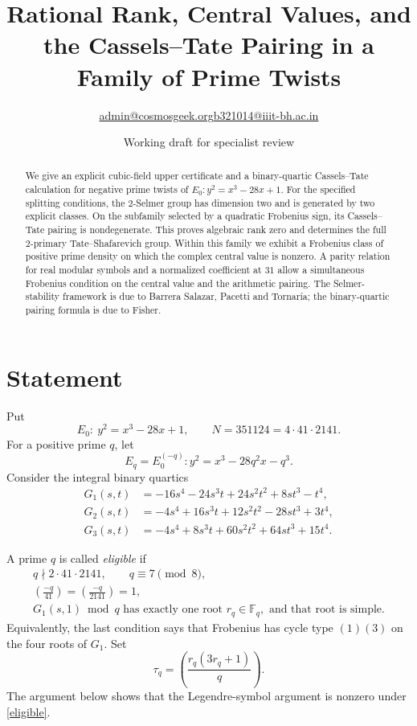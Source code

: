 \documentclass[11pt]{article}
\title{Rational Rank, Central Values, and the Cassels--Tate Pairing
in a Family of Prime Twists}
\author{\small \href{mailto:admin@cosmosgeek.org}{admin@cosmosgeek.org}\qquad \href{mailto:b321014@iiit-bh.ac.in}{b321014@iiit-bh.ac.in}}
\date{Working draft for specialist review}
\newcommand{\F}{\mathbb F}
\begin{document}
\maketitle

\begin{abstract}
We give an explicit cubic-field upper certificate and a
binary-quartic Cassels--Tate calculation for negative prime
twists of $E_0:y^2=x^3-28x+1$.
For the specified splitting conditions, the $2$-Selmer group
has dimension two and is generated by two explicit classes.
On the subfamily selected by a quadratic Frobenius sign, its
Cassels--Tate pairing is nondegenerate. This proves algebraic
rank zero and determines the full $2$-primary Tate--Shafarevich
group. Within this family we exhibit a Frobenius class of positive
prime density on which the complex central value is nonzero. A parity
relation for real modular symbols and a normalized coefficient at $31$
allow a simultaneous Frobenius condition on the central value and
the arithmetic pairing.
The Selmer-stability framework is due to Barrera Salazar,
Pacetti and Tornar\'ia; the binary-quartic pairing formula
is due to Fisher.
\end{abstract}

\section{Statement}

Put
\[
E_0:\ y^2=x^3-28x+1,\qquad
N=351124=4\cdot41\cdot2141.
\]
For a positive prime $q$, let
\[
E_q=E_0^{(-q)}:
y^2=x^3-28q^2x-q^3.
\]
Consider the integral binary quartics
\begin{align*}
G_1(s,t)&=-16s^4-24s^3t+24s^2t^2+8st^3-t^4,\\
G_2(s,t)&=-4s^4+16s^3t+12s^2t^2-28st^3+3t^4,\\
G_3(s,t)&=-4s^4+8s^3t+60s^2t^2+64st^3+15t^4.
\end{align*}

A prime $q$ is called \emph{eligible} if
\begin{equation}\label{eligible}
\begin{gathered}
q\nmid 2\cdot41\cdot2141,\qquad q\equiv7\pmod8,\\
\left(\frac{-q}{41}\right)
=\left(\frac{-q}{2141}\right)=1,\\
G_1(s,1)\bmod q
\text{ has exactly one root }r_q\in\F_q,
\text{ and that root is simple}.
\end{gathered}
\end{equation}
Equivalently, the last condition says that Frobenius has
cycle type $(1)(3)$ on the four roots of $G_1$.
Set
\[
\tau_q=\left(\frac{r_q(3r_q+1)}q\right).
\]
The argument below shows that the Legendre-symbol argument
is nonzero under \eqref{eligible}.
\end{document}
